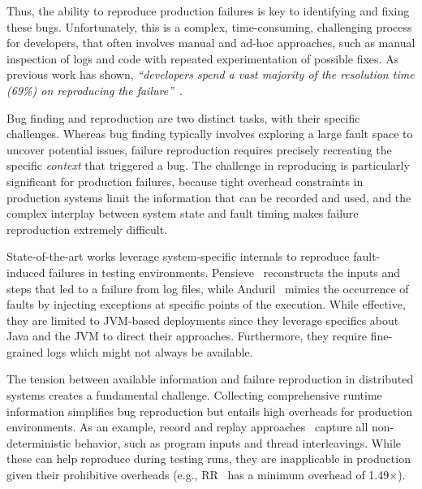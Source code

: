 Thus, the ability to reproduce production failures is key to identifying and fixing these bugs.
Unfortunately, this is a complex, time-consuming, challenging process for developers, that often involves manual and ad-hoc approaches, such as manual inspection of logs and code with repeated experimentation of possible fixes.
As previous work has shown, \textit{“developers spend a vast majority of the resolution time (69\%) on reproducing the failure”}~\cite{pensieve}. 

Bug finding and reproduction are two distinct tasks, with their specific challenges.
Whereas bug finding typically involves exploring a large fault space to uncover potential issues, failure reproduction requires precisely recreating the specific \emph{context} that triggered a bug.
The challenge in reproducing \efibshort is particularly significant for production failures, because tight overhead constraints in production systems limit the information that can be recorded and used, and the complex interplay between system state and fault timing makes failure reproduction extremely difficult.

State-of-the-art works leverage system-specific internals to reproduce fault-induced failures in testing environments.
Pensieve~\cite{pensieve} reconstructs the inputs and steps that led to a failure from log files, while Anduril~\cite{anduril} mimics the occurrence of faults by injecting exceptions at specific points of the execution.
While effective, they are limited to JVM-based deployments since they leverage specifics about Java and the JVM to direct their approaches.
Furthermore, they require fine-grained logs which might not always be available.


The tension between available information and failure reproduction in distributed systems creates a fundamental challenge. 
Collecting comprehensive runtime information simplifies bug reproduction but entails high overheads for production environments.
As an example, record and replay approaches~\cite{r2,ireplayer,doubleplay,mozilarr} capture all non-deterministic behavior, such as program inputs and thread interleavings.
While these can help reproduce \efibshort during testing runs, they are inapplicable in production given their prohibitive overheads (e.g., RR~\cite{mozilarr} has a minimum overhead of 1.49$\times$). 


